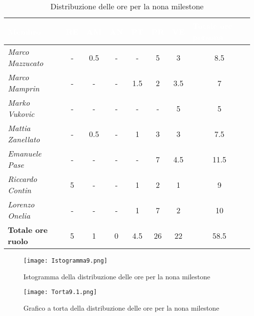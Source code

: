 \begin{table}[H]
    \renewcommand\arraystretch{1.5}
    \centering
    \begin{tabular}{|l|c|c|c|c|c|c|c|}
    \hline
    \rowcolor[HTML]{036400}
    \textcolor{white}{\textbf{Membro}} & \multicolumn{1}{l|}{\textcolor{white}{\textbf{RE}}} & \multicolumn{1}{l|}{\textcolor{white}{\textbf{AM}}} & \multicolumn{1}{l|}{\textcolor{white}{\textbf{AN}}} & \multicolumn{1}{l|}{\textcolor{white}{\textbf{PT}}} & \multicolumn{1}{l|}{\textcolor{white}{\textbf{PR}}} & \multicolumn{1}{l|}{\textcolor{white}{\textbf{VE}}} & \multicolumn{1}{l|}{\textcolor{white}{\textbf{Totale ore persona}}} \\ \hline
    \rowcolor[HTML]{EFEFEF}\textit{Marco Mazzucato}  & - & 0.5 & -  & -    & 5   & 3    & 8.5     \\ \hline
    \rowcolor[HTML]{C0C0C0}\textit{Marco Mamprin}    & - & -   & -  & 1.5  & 2   & 3.5  & 7     \\ \hline
    \rowcolor[HTML]{EFEFEF}\textit{Marko Vukovic}    & - & -   & -  & -    & -   & 5    & 5     \\ \hline
    \rowcolor[HTML]{C0C0C0}\textit{Mattia Zanellato} & - & 0.5 & -  & 1    & 3   & 3    & 7.5     \\ \hline
    \rowcolor[HTML]{EFEFEF}\textit{Emanuele Pase}    & - & -   & -  & -    & 7   & 4.5  & 11.5     \\ \hline
    \rowcolor[HTML]{C0C0C0}\textit{Riccardo Contin}  & 5 & -   & -  & 1    & 2   & 1    & 9     \\ \hline
    \rowcolor[HTML]{EFEFEF}\textit{Lorenzo Onelia}   & - & -   & -  & 1    & 7   & 2    & 10    \\ \hline
    \rowcolor[HTML]{C0C0C0}\textbf{Totale ore ruolo} & 5 & 1   & 0  & 4.5  & 26  & 22   & 58.5    \\ \hline
    \end{tabular}
    \caption{Distribuzione delle ore per la nona milestone}
\end{table}

\begin{figure}[H]
    \texttt{[image: Istogramma9.png]}
    \caption{Istogramma della distribuzione delle ore per la nona milestone}
\end{figure}

\begin{figure}[H]
    \texttt{[image: Torta9.1.png]}
    \caption{Grafico a torta della distribuzione delle ore per la nona milestone}
\end{figure}

